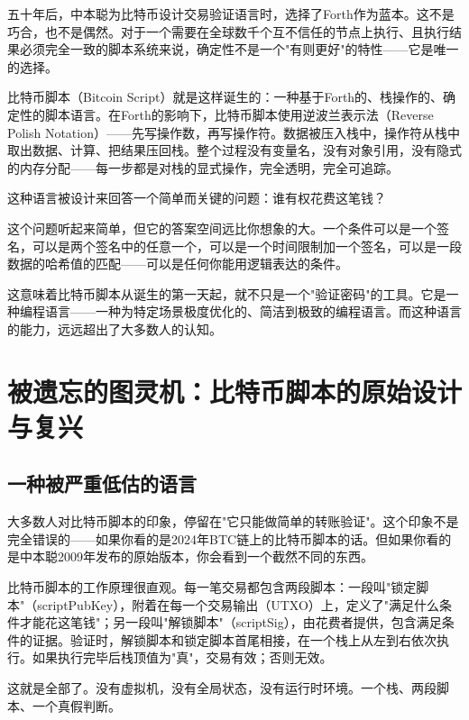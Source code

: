 \documentclass[a4paper,12pt,openany]{ctexbook}
\begin{document}
五十年后，中本聪为比特币设计交易验证语言时，选择了Forth作为蓝本。这不是巧合，也不是偶然。对于一个需要在全球数千个互不信任的节点上执行、且执行结果必须完全一致的脚本系统来说，确定性不是一个"有则更好"的特性——它是唯一的选择。

比特币脚本（Bitcoin Script）就是这样诞生的：一种基于Forth的、栈操作的、确定性的脚本语言。在Forth的影响下，比特币脚本使用逆波兰表示法（Reverse Polish Notation）——先写操作数，再写操作符。数据被压入栈中，操作符从栈中取出数据、计算、把结果压回栈。整个过程没有变量名，没有对象引用，没有隐式的内存分配——每一步都是对栈的显式操作，完全透明，完全可追踪。

这种语言被设计来回答一个简单而关键的问题：谁有权花费这笔钱？

这个问题听起来简单，但它的答案空间远比你想象的大。一个条件可以是一个签名，可以是两个签名中的任意一个，可以是一个时间限制加一个签名，可以是一段数据的哈希值的匹配——可以是任何你能用逻辑表达的条件。

这意味着比特币脚本从诞生的第一天起，就不只是一个"验证密码"的工具。它是一种编程语言——一种为特定场景极度优化的、简洁到极致的编程语言。而这种语言的能力，远远超出了大多数人的认知。


\section*{被遗忘的图灵机：比特币脚本的原始设计与复兴}



\subsection*{一种被严重低估的语言}


大多数人对比特币脚本的印象，停留在"它只能做简单的转账验证"。这个印象不是完全错误的——如果你看的是2024年BTC链上的比特币脚本的话。但如果你看的是中本聪2009年发布的原始版本，你会看到一个截然不同的东西。

比特币脚本的工作原理很直观。每一笔交易都包含两段脚本：一段叫"锁定脚本"（scriptPubKey），附着在每一个交易输出（UTXO）上，定义了"满足什么条件才能花这笔钱"；另一段叫"解锁脚本"（scriptSig），由花费者提供，包含满足条件的证据。验证时，解锁脚本和锁定脚本首尾相接，在一个栈上从左到右依次执行。如果执行完毕后栈顶值为"真"，交易有效；否则无效。

这就是全部了。没有虚拟机，没有全局状态，没有运行时环境。一个栈、两段脚本、一个真假判断。
\end{document}
